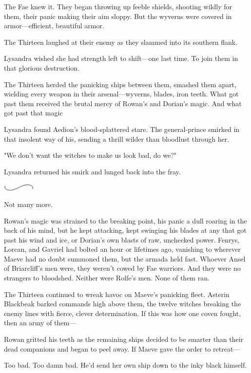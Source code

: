 The Fae knew it. They began throwing up feeble shields, shooting wildly for them, their panic making their aim sloppy. But the wyverns were covered in armor---efficient, beautiful armor.

The Thirteen laughed at their enemy as they slammed into its southern flank.

Lysandra wished she had strength left to shift---one last time. To join them in that glorious destruction.

The Thirteen herded the panicking ships between them, smashed them apart, wielding every weapon in their arsenal---wyverns, blades, iron teeth. What got past them received the brutal mercy of Rowan's and Dorian's magic. And what got past that magic 

Lysandra found Aedion's blood-splattered stare. The general-prince smirked in that insolent way of his, sending a thrill wilder than bloodlust through her.

"We don't want the witches to make us look bad, do we?"

Lysandra returned his smirk and lunged back into the fray.

\includegraphics[width=0.65in,height=0.13in]{images/seperator}

Not many more.

Rowan's magic was strained to the breaking point, his panic a dull roaring in the back of his mind, but he kept attacking, kept swinging his blades at any that got past his wind and ice, or Dorian's own blasts of raw, unchecked power. Fenrys, Lorcan, and Gavriel had bolted an hour or lifetimes ago, vanishing to wherever Maeve had no doubt summoned them, but the armada held fast. Whoever Ansel of Briarcliff's men were, they weren't cowed by Fae warriors. And they were no strangers to bloodshed. Neither were Rolfe's men. None of them ran.

The Thirteen continued to wreak havoc on Maeve's panicking fleet. Asterin Blackbeak barked commands high above them, the twelve witches breaking the enemy lines with fierce, clever determination. If this was how one coven fought, then an army of them---

Rowan gritted his teeth as the remaining ships decided to be smarter than their dead companions and began to peel away. If Maeve gave the order to retreat---

Too bad. Too damn bad. He'd send her own ship down to the inky black himself.

